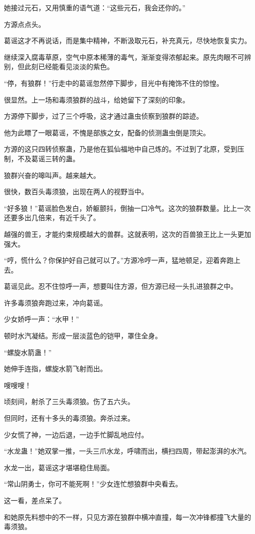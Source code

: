 \begin{this_body}
她接过元石，又用慎重的语气道：“这些元石，我会还你的。”

方源点点头。

葛谣这才不再说话，而是集中精神，不断汲取元石，补充真元，尽快地恢复实力。

继续深入腐毒草原，空气中原本稀薄的毒气，渐渐变得浓郁起来。原先肉眼不可辨别，但此刻已经能看见淡淡的紫色。

“停，有狼群！”行走中的葛谣忽然停下脚步，目光中有掩饰不住的惊惶。

很显然。上一场和毒须狼群的战斗，给她留下了深刻的印象。

方源停下脚步，过了三个呼吸，这才通过蛊虫侦察到狼群的踪迹。

他为此瞟了一眼葛谣，不愧是部族之女，配备的侦测蛊虫倒是顶尖。

方源的这只四转侦察蛊，乃是他在狐仙福地中自己炼的。不过到了北原，受到压制，不及葛谣三转的蛊。

狼群兴奋的嗥叫声。越来越大。

很快，数百头毒须狼，出现在两人的视野当中。

“好多狼！”葛谣脸色发白，娇躯颤抖，倒抽一口冷气。这次的狼群数量。比上一次还要多出几倍来，有近千头了。

越强的兽王，才能约束规模越大的兽群。这就表明，这次的百兽狼王比上一头更加强大。

“哼，慌什么？你保护好自己就可以了。”方源冷哼一声，猛地顿足，迎着奔跑上去。

葛谣见此。忍不住惊呼一声，想要叫住方源，但方源已经一头扎进狼群之中。

许多毒须狼奔跑过来，冲向葛谣。

少女娇呼一声：“水甲！”

顿时水汽凝结。形成一层淡蓝色的铠甲，罩住全身。

“螺旋水箭蛊！”

她伸手连指，螺旋水箭飞射而出。

嗖嗖嗖！

顷刻间，射杀了三头毒须狼。伤了五六头。

但同时，还有十多头的毒须狼。奔杀过来。

少女慌了神，一边后退，一边手忙脚乱地应付。

“水龙蛊！”她双掌一推，一头三爪水龙，呼啸而出，横扫四周，带起澎湃的水汽。

水龙一出，葛谣这才堪堪稳住局面。

“常山阴勇士，你可不能死啊！”少女连忙想狼群中央看去。

这一看，差点呆了。

和她原先料想中的不一样，只见方源在狼群中横冲直撞，每一次冲锋都撞飞大量的毒须狼。


\end{this_body}
